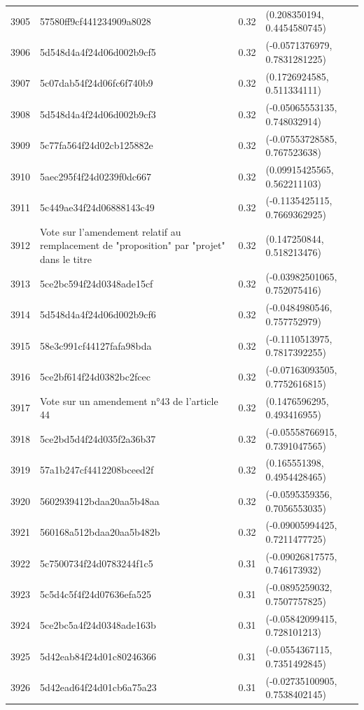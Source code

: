 \begin{table}[ht]
\begin{tabular}{rlrl}
  3905 & 57580ff9cf441234909a8028 & 0.32 & (0.208350194, 0.4454580745) \\ 
  3906 & 5d548d4a4f24d06d002b9cf5 & 0.32 & (-0.0571376979, 0.7831281225) \\ 
  3907 & 5c07dab54f24d06fc6f740b9 & 0.32 & (0.1726924585, 0.511334111) \\ 
  3908 & 5d548d4a4f24d06d002b9cf3 & 0.32 & (-0.05065553135, 0.748032914) \\ 
  3909 & 5c77fa564f24d02cb125882e & 0.32 & (-0.07553728585, 0.767523638) \\ 
  3910 & 5aec295f4f24d0239f0dc667 & 0.32 & (0.09915425565, 0.562211103) \\ 
  3911 & 5c449ae34f24d06888143c49 & 0.32 & (-0.1135425115, 0.7669362925) \\ 
  3912 & Vote sur l'amendement relatif au remplacement de "proposition" par "projet" dans le titre & 0.32 & (0.147250844, 0.518213476) \\ 
  3913 & 5ce2bc594f24d0348ade15cf & 0.32 & (-0.03982501065, 0.752075416) \\ 
  3914 & 5d548d4a4f24d06d002b9cf6 & 0.32 & (-0.0484980546, 0.757752979) \\ 
  3915 & 58e3c991cf44127fafa98bda & 0.32 & (-0.1110513975, 0.7817392255) \\ 
  3916 & 5ce2bf614f24d0382bc2fcec & 0.32 & (-0.07163093505, 0.7752616815) \\ 
  3917 & Vote sur un amendement n°43 de l'article 44 & 0.32 & (0.1476596295, 0.493416955) \\ 
  3918 & 5ce2bd5d4f24d035f2a36b37 & 0.32 & (-0.05558766915, 0.7391047565) \\ 
  3919 & 57a1b247cf4412208bceed2f & 0.32 & (0.165551398, 0.4954428465) \\ 
  3920 & 5602939412bdaa20aa5b48aa & 0.32 & (-0.0595359356, 0.7056553035) \\ 
  3921 & 560168a512bdaa20aa5b482b & 0.32 & (-0.09005994425, 0.7211477725) \\ 
  3922 & 5c7500734f24d0783244f1c5 & 0.31 & (-0.09026817575, 0.746173932) \\ 
  3923 & 5c5d4c5f4f24d07636efa525 & 0.31 & (-0.0895259032, 0.7507757825) \\ 
  3924 & 5ce2bc5a4f24d0348ade163b & 0.31 & (-0.05842099415, 0.728101213) \\ 
  3925 & 5d42eab84f24d01c80246366 & 0.31 & (-0.0554367115, 0.7351492845) \\ 
  3926 & 5d42ead64f24d01cb6a75a23 & 0.31 & (-0.02735100905, 0.7538402145) \\ 

\end{tabular}
\end{table}

